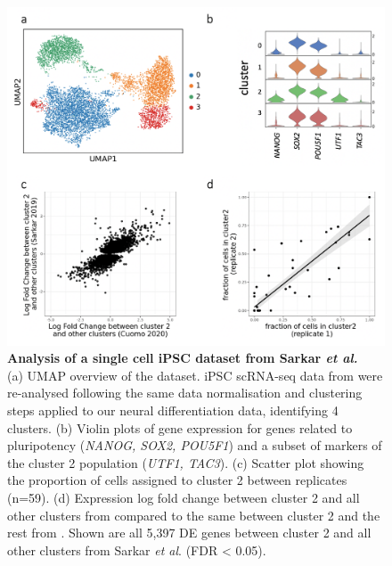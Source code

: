 \begin{figure}[h]
    \centering
    \includegraphics[width=16cm]{Appendix2/Fig/suppl_ipsc_cluster2_sarkar.png}
    \caption[Analysis of a single cell iPSC dataset from Sarkar \textit{et al.}]{\textbf{Analysis of a single cell iPSC dataset from Sarkar \textit{et al.}}\\
    (a) UMAP overview of the dataset. 
    iPSC scRNA-seq data from \cite{sarkar2019discovery} were re-analysed following the same data normalisation and clustering steps applied to our neural differentiation data, identifying 4 clusters. 
    (b) Violin plots of gene expression for genes related to pluripotency (\textit{NANOG, SOX2, POU5F1}) and a subset of markers of the cluster 2 population (\textit{UTF1, TAC3}). 
    (c) Scatter plot showing the proportion of cells assigned to cluster 2 between replicates (n=59). 
    (d) Expression log fold change between cluster 2 and all other clusters from \cite{cuomo2020single} compared to the same between cluster 2 and the rest from \cite{sarkar2019discovery}. 
    Shown are all 5,397 DE genes between cluster 2 and all other clusters from Sarkar \textit{et al}. (FDR < 0.05).}
    \label{suppl_fig:ipsc_cluster2_sarkar}
\end{figure}




